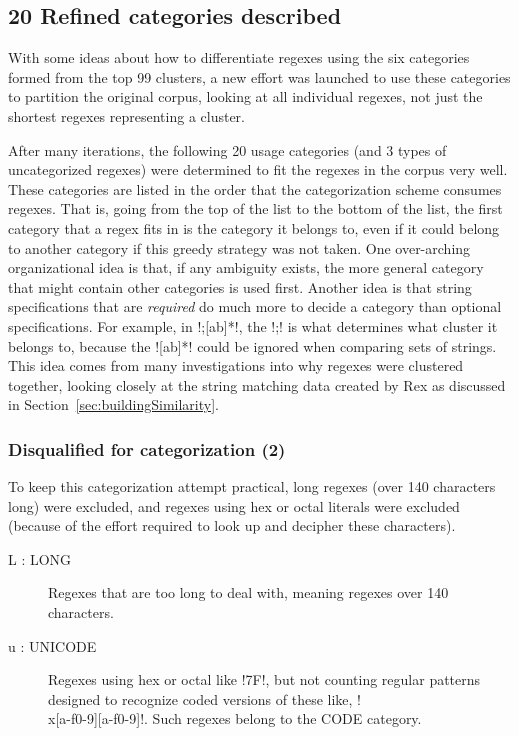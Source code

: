 \subsection{20 Refined categories described}
\label{sec:20refinedCategories}

With some ideas about how to differentiate regexes using the six categories formed from the top 99 clusters, a new effort was launched to use these categories to partition the original corpus, looking at all individual regexes, not just the shortest regexes representing a cluster.

After many iterations, the following 20 usage categories (and 3 types of uncategorized regexes) were determined to fit the regexes in the corpus very well.  These categories are listed in the order that the categorization scheme consumes regexes.  That is, going from the top of the list to the bottom of the list, the first category that a regex fits in is the category it belongs to, even if it could belong to another category if this greedy strategy was not taken.  One over-arching organizational idea is that, if any ambiguity exists, the more general category that might contain other categories is used first.  Another idea is that string specifications that are \emph{required} do much more to decide a category than optional specifications.  For example, in \cverb!;[ab]*!, the \cverb!;! is what determines what cluster it belongs to, because the \bverb![ab]*! could be ignored when comparing sets of strings.  This idea comes from many investigations into why regexes were clustered together, looking closely at the string matching data created by Rex as discussed in Section~\ref{sec:buildingSimilarity}.

\subsubsection{Disqualified for categorization (2)}
To keep this categorization attempt practical, long regexes (over 140 characters long) were excluded, and regexes  using hex or octal literals were excluded (because of the effort required to look up and decipher these characters).
\begin{description}
\item[ L : LONG ] Regexes that are too long to deal with, meaning regexes over 140 characters.
\item[ u : UNICODE ] Regexes using hex or octal like \cverb!\x7F!, but not counting regular patterns designed to recognize coded versions of these like, \cverb!\\x[a-f0-9][a-f0-9]!.  Such regexes belong to the CODE category.
\end{description}

